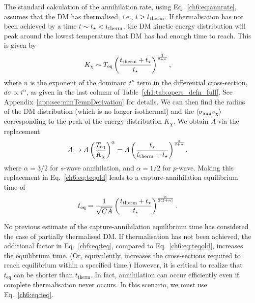 The standard calculation of the annihilation rate, using Eq.~\ref{ch6:eq:annrate}, assumes that the DM has thermalised, i.e., $t > t_{\rm therm}$. 
If thermalisation has not been achieved by a time $t\sim t_\star<t_{\rm therm}$, the DM kinetic energy distribution will peak around the lowest temperature that DM has had enough time to reach. This is given by 
%
\begin{equation}
K_\chi \sim T_{\rm eq} \left(\frac{t_{\rm therm}+t_\star}{t_\star}\right)^{\frac{1}{2+n}},
\label{ch6:eq:lowtemp} 
\end{equation}
%
where $n$ is the exponent of the dominant $t^n$ term in the differential cross-section, $d\sigma \propto t^n$, as given in the last column of Table~\ref{ch1:tab:opers_defn_full}. See Appendix~\ref{app:sec:minTempDerivation} for details. 
We can then find the radius of the DM distribution (which is no longer isothermal) and the $\langle \sigma_{\rm ann} v_\chi \rangle$ corresponding to the peak of the energy distribution $K_\chi$. 
We obtain $A$ via the replacement  
%
\begin{equation}
    A \rightarrow A \left(\frac{T_\text{eq}}{K_\chi}\right)^{\alpha} = 
   A \left(\frac{t_\star}{t_\text{therm}+t_\star}\right)^{\frac{\alpha}{2+n}},  
\end{equation}
%
where $\alpha=3/2$ for $s$-wave annihilation, and $\alpha=1/2$ for $p$-wave. 
Making this replacement in Eq.~\ref{ch6:eq:teqold} leads to a capture-annihilation equilibrium time of
\begin{equation}
 t_{\rm eq} = \frac{1}{\sqrt{C A}} \left(\frac{t_\text{therm}+t_\star}{t_\star}\right)^{\frac{\alpha}{2(2+n)}}. \label{ch6:eq:teq} 
\end{equation}

No previous estimate of the capture-annihilation equilibrium time has considered the case of partially thermalised DM. If thermalisation has not been achieved, the additional factor in Eq.~\ref{ch6:eq:teq}, compared to Eq.~\ref{ch6:eq:teqold}, increases the equilibrium time. (Or, equivalently, increases the cross-sections required to reach equilibrium within a specified time.) However, it is critical to realize that $t_\text{eq}$ can be shorter than $t_\text{therm}$. 
In fact, annihilation can occur efficiently even if complete thermalisation never occurs. In this scenario, we must use Eq.~\ref{ch6:eq:teq}.



